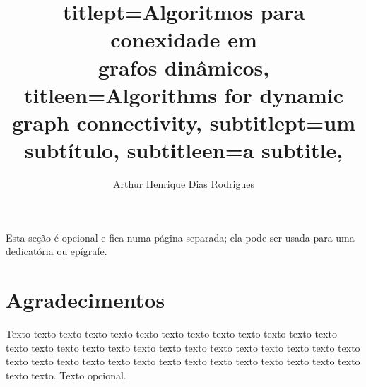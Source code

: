 \documentclass[12pt,twoside,english,brazilian]{book}
\title{
    titlept={Algoritmos para conexidade em\\ grafos dinâmicos},
    titleen={Algorithms for dynamic graph connectivity},
    subtitlept={um subtítulo},
    subtitleen={a subtitle},
}
\author{Arthur Henrique Dias Rodrigues}
\begin{document}

\frontmatter

\pagestyle{plain}

\onehalfspacing %

\maketitle %


\begin{dedicatoria}
Esta seção é opcional e fica numa página separada; ela pode ser usada para
uma dedicatória ou epígrafe.
\end{dedicatoria}


\chapter*{Agradecimentos}

Texto texto texto texto texto texto texto texto texto texto texto texto texto
texto texto texto texto texto texto texto texto texto texto texto texto texto
texto texto texto texto texto texto texto texto texto texto texto texto texto
texto texto texto texto. Texto opcional.




\end{document}
